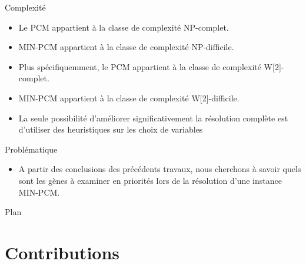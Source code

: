 \documentclass{beamer}
\begin{document}
\begin{frame}
	\begin{alertblock}{Complexité}
			\begin{itemize}
				\item Le PCM appartient à la classe de complexité NP-complet.
				\pause
				\item MIN-PCM appartient à la classe de complexité NP-difficile.
				\pause
				\item Plus spécifiquemment, le PCM appartient à la classe de complexité W[2]-complet.
				\pause
				\item MIN-PCM appartient à la classe de complexité W[2]-difficile.
				\pause
				\item La seule possibilité d'améliorer significativement la résolution complète est d'utiliser des heuristiques sur les choix de variables
				\pause
			\end{itemize}
	\end{alertblock}
	\begin{block}{Problématique}
		\begin{itemize}
				\item A partir des conclusions des précédents travaux, nous cherchons à savoir quels sont les gènes à examiner en priorités lors de la résolution d'une instance MIN-PCM.
			\end{itemize}
	\end{block}
	
\end{frame}

\begin{frame}{Plan}
	\tableofcontents
\end{frame}

\section*{Contributions}
\end{document}
